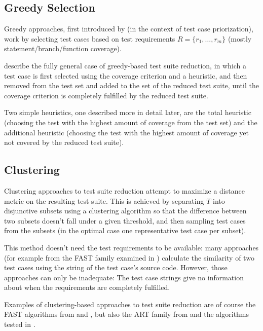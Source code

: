 \subsection{Greedy Selection}

Greedy approaches, first introduced by \cite{rothermel2001prioritizing}
(in the context of test case priorization), work by selecting test
cases based on test requirements $R=\{r_1, \dots, r_{m}\}$ (mostly
statement/branch/function coverage).

\cite{khan2018systematic} describe the fully general case of greedy-based
test suite reduction, in which a test case is first selected using
the coverage criterion and a heuristic, and then removed from the test
set and added to the set of the reduced test suite, until the coverage
criterion is completely fulfilled by the reduced test suite.

Two simple heuristics, one described more in detail later, are the total
heuristic (choosing the test with the highest amount of coverage from
the test set) and the additional heuristic (choosing the test with the
highest amount of coverage yet not covered by the reduced test suite).

\subsection{Clustering}

Clustering approaches to test suite reduction attempt to maximize
a distance metric on the resulting test suite. This is achieved by
separating $T$ into disjunctive subsets using a clustering algorithm
so that the difference between two subsets doesn't fall under a given %
threshold, and then sampling test cases from the subsets (in the optimal
case one representative test case per subset).

This method doesn't need the test requirements to be available:
many approaches (for example from the FAST family examined in
\cite{miranda2018fast}) calculate the similarity of two test cases using
the string of the test case's source code. However, those approaches can
only be inadequate: The test case strings give no information about when
the requirements are completely fulfilled.

Examples of clustering-based approaches to test suite reduction are
of course the FAST algorithms from \cite{cruciani2019scalable}
and \cite{miranda2018fast}, but also the ART family from
\cite{chen2010adaptive} and the algorithms tested in
\cite{hemmati2010achieving}.

